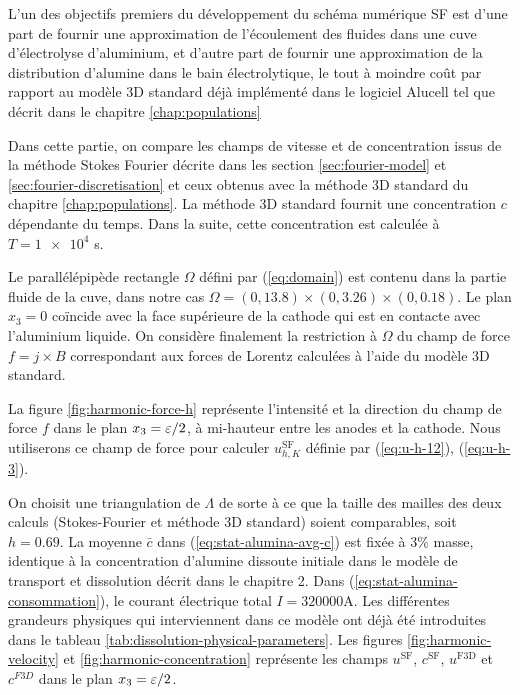 \renewcommand{\floatpagefraction}{.9}%
\renewcommand{\topfraction}{0.9}

L'un des objectifs premiers du développement du schéma numérique
SF est d'une part de fournir une approximation de l'écoulement des
fluides dans une cuve d'électrolyse d'aluminium, et d'autre part
de fournir une approximation de la distribution d'alumine dans le bain
électrolytique, le tout à moindre coût par rapport au modèle
3D standard déjà implémenté dans le logiciel Alucell tel que décrit
dans le chapitre \ref{chap:populations}

Dans cette partie, on compare les champs de vitesse et de
concentration issus de la méthode Stokes Fourier décrite dans les
section \ref{sec:fourier-model} et \ref{sec:fourier-discretisation} et
ceux obtenus avec la méthode 3D standard du chapitre
\ref{chap:populations}. La méthode 3D standard fournit une
concentration $c$ dépendante du temps. Dans la suite, cette
concentration est calculée à $T = \num{1e4}$ \si{\second}.

Le parallélépipède rectangle $\Omega$ défini par (\ref{eq:domain}) est
contenu dans la partie fluide de la cuve, dans notre cas $\Omega = (0,
\num{13.8})\times(0,\num{3.26})\times(0,\num{0.18})$. Le plan $x_3 =
0$ coïncide avec la face supérieure de la cathode qui est en contacte
avec l'aluminium liquide. On considère finalement la restriction à
$\Omega$ du champ de force $f = j\times B$ correspondant aux forces de
Lorentz calculées à l'aide du modèle 3D standard.

La figure \ref{fig:harmonic-force-h} représente l'intensité et la
direction du champ de force $f$ dans le plan $x_3 = \varepsilon / 2$,
à mi-hauteur entre les anodes et la cathode. Nous utiliserons ce champ
de force pour calculer $u_{h,K}^\mathrm{SF}$ définie par
(\ref{eq:u-h-12}), (\ref{eq:u-h-3}).

On choisit une triangulation de $\Lambda$ de sorte à ce que la taille
des mailles des deux calculs (Stokes-Fourier et méthode 3D standard)
soient comparables, soit $h = \num{0.69}$. La moyenne $\bar{c}$ dans
(\ref{eq:stat-alumina-avg-c}) est fixée à 3\% masse, identique à la
concentration d'alumine dissoute initiale dans le modèle de transport
et dissolution décrit dans le chapitre 2. Dans
(\ref{eq:stat-alumina-consommation}), le courant électrique total $I =
\num{320000} \si{\ampere}$. Les différentes grandeurs physiques qui
interviennent dans ce modèle ont déjà été introduites dans le tableau
\ref{tab:dissolution-physical-parameters}. Les figures
\ref{fig:harmonic-velocity} et \ref{fig:harmonic-concentration}
représente les champs $u^{\mathrm{SF}}$, $c^\mathrm{SF}$,
$u^\mathrm{F3D}$ et $c^{F3D}$ dans le plan $x_3 = \varepsilon / 2$.

